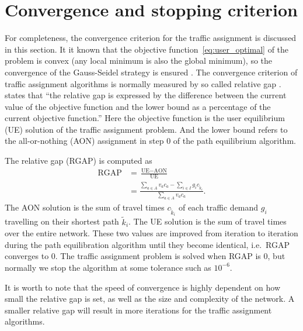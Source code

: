 \section{Convergence and stopping criterion} \label{sec:convergence}
For completeness, the convergence criterion for the traffic assignment is discussed in this section.
It it known that the objective function~\eqref{eq:user_optimal} of the problem is convex (any local minimum is also the global minimum),
so the convergence of the Gauss-Seidel strategy is ensured \citep{Florian2008}.
The convergence criterion of traffic assignment algorithms is normally measured by so called relative gap \citep{Rose}.
\cite{Rose} states that ``the relative gap is expressed by the difference between the current value of 
the objective function and the lower bound as a percentage of the current objective function.''
Here the objective function is the user equilibrium (UE) solution of the traffic assignment problem.
And the lower bound refers to the all-or-nothing (AON) assignment in step 0 of the path equilibrium algorithm.

The relative gap (RGAP) is computed as
\begin{align}
    \text{RGAP} &= \frac{\text{UE} - \text{AON}}{\text{UE}} \\
    &= \frac{\sum_{a \in A} v_a c_a - \sum_{i \in I} g_i c_{\tilde{k}_i}}{\sum_{a \in A} v_a c_a}.
\end{align}
The AON solution is the sum of travel times $c_{\tilde{k}_i}$ of each traffic demand $g_i$ travelling on their shortest path $\tilde{k}_i$.
The UE solution is the sum of travel times over the entire network.
These two values are improved from iteration to iteration during the path equilibration algorithm until they become identical, i.e.\ RGAP converges to 0.
The traffic assignment problem is solved when RGAP is 0,
but normally we stop the algorithm at some tolerance such as $10^{-6}$.

It is worth to note that the speed of convergence is highly dependent on how small the relative gap is set,
as well as the size and complexity of the network.
A smaller relative gap will result in more iterations for the traffic assignment algorithms.

